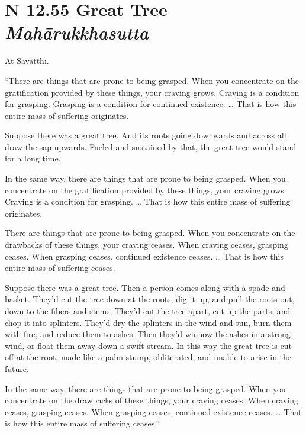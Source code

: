 \documentclass[12pt,openany]{book}%
\newcommand*{\suttatitleacronym}[1]{\smaller[2]{#1}\vspace*{.3em}}
\newcommand*{\suttatitletranslation}[1]{\linebreak{#1}}
\newcommand*{\suttatitleroot}[1]{\linebreak\smaller[2]\itshape{#1}}
\newcommand*{\tocacronym}[1]{\hspace*{-3.3em}{#1}\quad}
\newcommand*{\toctranslation}[1]{#1}
\newcommand*{\tocroot}[1]{(\textit{#1})}
\begin{document}
%
\section*{{\suttatitleacronym SN 12.55}{\suttatitletranslation A Great Tree }{\suttatitleroot Mahārukkhasutta}}
\addcontentsline{toc}{section}{\tocacronym{SN 12.55} \toctranslation{A Great Tree } \tocroot{Mahārukkhasutta}}

At \textsanskrit{Sāvatthī}. 

“There are things that are prone to being grasped. When you concentrate on the gratification provided by these things, your craving grows. Craving is a condition for grasping. Grasping is a condition for continued existence. … That is how this entire mass of suffering originates. 

Suppose there was a great tree. And its roots going downwards and across all draw the sap upwards. Fueled and sustained by that, the great tree would stand for a long time. 

In the same way, there are things that are prone to being grasped. When you concentrate on the gratification provided by these things, your craving grows. Craving is a condition for grasping. … That is how this entire mass of suffering originates. 

There are things that are prone to being grasped. When you concentrate on the drawbacks of these things, your craving ceases. When craving ceases, grasping ceases. When grasping ceases, continued existence ceases. … That is how this entire mass of suffering ceases. 

Suppose there was a great tree. Then a person comes along with a spade and basket. They’d cut the tree down at the roots, dig it up, and pull the roots out, down to the fibers and stems. They’d cut the tree apart, cut up the parts, and chop it into splinters. They’d dry the splinters in the wind and sun, burn them with fire, and reduce them to ashes. Then they’d winnow the ashes in a strong wind, or float them away down a swift stream. In this way the great tree is cut off at the root, made like a palm stump, obliterated, and unable to arise in the future. 

In the same way, there are things that are prone to being grasped. When you concentrate on the drawbacks of these things, your craving ceases. When craving ceases, grasping ceases. When grasping ceases, continued existence ceases. … That is how this entire mass of suffering ceases.” 
\end{document}
